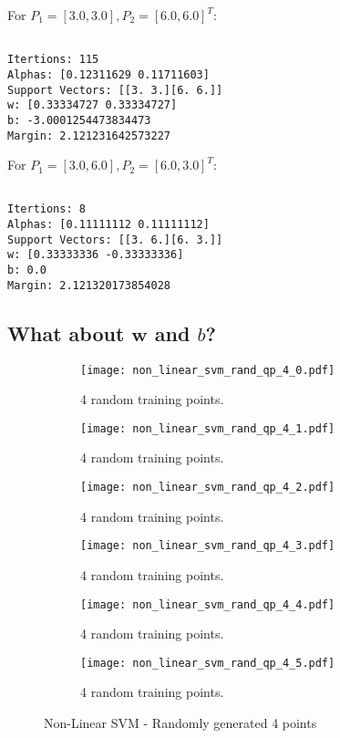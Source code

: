\documentclass[10pt, a4paper,reqno]{amsart}
\begin{document}
For $P_1 = [3.0, 3.0], P_2 = [6.0, 6.0]^T$:

\begin{verbatim}

Itertions: 115
Alphas: [0.12311629 0.11711603]
Support Vectors: [[3. 3.][6. 6.]]
w: [0.33334727 0.33334727]
b: -3.0001254473834473
Margin: 2.121231642573227

\end{verbatim}

For $P_1 = [3.0, 6.0], P_2 = [6.0, 3.0]^T$:

\begin{verbatim}

Itertions: 8
Alphas: [0.11111112 0.11111112]
Support Vectors: [[3. 6.][6. 3.]]
w: [0.33333336 -0.33333336]
b: 0.0
Margin: 2.121320173854028

\end{verbatim}


\subsection{What about $\mathbf{w}$ and $b$?}


\begin{figure}[H]
	\centering	
	\begin{subfigure}{0.5\textwidth}
		\centering
		\texttt{[image: non\_linear\_svm\_rand\_qp\_4\_0.pdf]}
		\caption{4 random training points.}
	\end{subfigure}%
	\begin{subfigure}{0.5\textwidth}
		\centering
		\texttt{[image: non\_linear\_svm\_rand\_qp\_4\_1.pdf]}
		\caption{4 random training points.}
	\end{subfigure}
	\begin{subfigure}{0.5\textwidth}
		\centering
		\texttt{[image: non\_linear\_svm\_rand\_qp\_4\_2.pdf]}
		\caption{4 random training points.}
	\end{subfigure}%
	\begin{subfigure}{0.5\textwidth}
		\centering
		\texttt{[image: non\_linear\_svm\_rand\_qp\_4\_3.pdf]}
		\caption{4 random training points.}
	\end{subfigure}
	\begin{subfigure}{0.5\textwidth}
		\centering
		\texttt{[image: non\_linear\_svm\_rand\_qp\_4\_4.pdf]}
		\caption{4 random training points.}
	\end{subfigure}%
	\begin{subfigure}{0.5\textwidth}
		\centering
		\texttt{[image: non\_linear\_svm\_rand\_qp\_4\_5.pdf]}
		\caption{4 random training points.}
	\end{subfigure}
	\caption{Non-Linear SVM - Randomly generated 4 points}
\end{figure}
\end{document}
